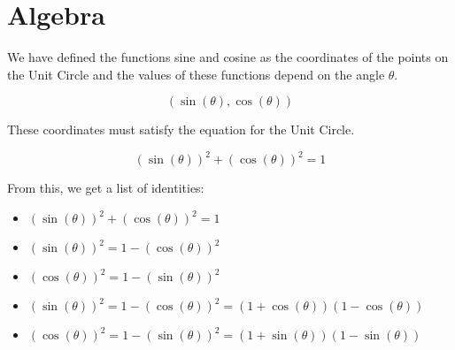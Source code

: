 \documentclass{ximera}
\begin{document}
\section*{Algebra}

We have defined the functions sine and cosine as the coordinates of the points on the Unit Circle and the values of these functions depend on the angle $\theta$.

\[    ( \sin(\theta), \cos(\theta) ) \]


These coordinates must satisfy the equation for the Unit Circle. 



\[    ( \sin(\theta) )^2 + ( \cos(\theta) )^2 = 1 \]



From this, we get a list of identities:



\begin{observation}


\begin{itemize}
\item $( \sin(\theta) )^2 + ( \cos(\theta) )^2 = 1$
\item $( \sin(\theta) )^2 =  1 - ( \cos(\theta) )^2$
\item $( \cos(\theta) )^2 =  1 - ( \sin(\theta) )^2$
\item $( \sin(\theta) )^2 =  1 - ( \cos(\theta) )^2 = (1 + \cos(\theta))(1 - \cos(\theta))$
\item $( \cos(\theta) )^2 =  1 - ( \sin(\theta) )^2 = (1 + \sin(\theta))(1 - \sin(\theta))$
\end{itemize}


\end{observation}
\end{document}
